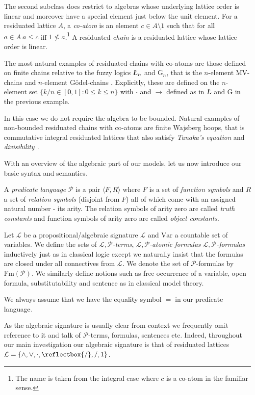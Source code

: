 \documentclass{lmcs} %
\newcommand{\?}{\ensuremath{\mkern0.4\thinmuskip}}
\newcommand{\Luk}{\text{\textsl{\L}}}%
\newcommand{\und}{\mathord{\reflectbox{/}}}%
\newcommand{\CL}{\mathcal{L}}
\newcommand{\CP}{\mathcal{P}}
\begin{document}
The second subclass does restrict to algebras whose underlying lattice order is linear and moreover have a special element just below the unit element. For a residuated lattice $A$, a \emph{co-atom} is an element $c\in A\setminus{1}$ such that for all $a\in A\ a\leq c$ iff $1\not\leq a$.\footnote{The name is taken from the integral case where $c$ is a co-atom in the familiar sense.} A residuated \emph{chain} is a residuated lattice whose lattice order is linear. 

\begin{exa}\label{exa:resichaincoatom}
    The most natural examples of residuated chains with co-atoms are those defined on finite chains relative to the fuzzy logics $\Luk_n$ and $\mathrm{G}_n$, that is the $n$-element MV-chains and $n$-element G\"{o}del-chains \cite[Example 2.4.2, Definition 1.3.1 ]{CintulaHajekNoguera11:Handbookvol2}. Explicitly, these are defined on the $n$-element set $\{k/n\in [0,1]:0\leq k\leq n\}$ with $\cdot$ and $\rightarrow$ defined as in $\Luk$ and $\mathrm{G}$ in the previous example.
    
    In this case we do not require the algebra to be bounded. Natural examples of non-bounded residuated chains with co-atoms are finite Wajsberg hoops, that is commutative integral residuated lattices that also satisfy \emph{Tanaka's equation} and \emph{divisibility}~\cite{Ugolini34:Wajsberghoops}.
\end{exa}

With an overview of the algebraic part of our models, let us now introduce our basic syntax and semantics. 
\begin{defi}
    A \textit{predicate language} $\CP$ is a pair $\langle F,R\rangle$ where $F$ is a set of \textit{function symbols} and $R$ a set of \textit{relation symbols} (disjoint from $F$) all of which come with an assigned natural number - its arity. The relation symbols of arity zero are called \textit{truth constants} and function symbols of arity zero are called \textit{object constants}. 

    Let $\CL$ be a propositional/algebraic signature $\CL$ and $\mathrm{Var}$ a countable set of variables. We define the sets of $\CL,\CP$\textit{-terms}, $\CL,\CP$\textit{-atomic formulas} $\CL,\CP$\textit{-formulas} inductively just as in classical logic except we naturally insist that the formulas are closed under all connectives from $\CL$. We denote the set of $\CP$-formulas by $\mathrm{Fm}(\CP)$. We similarly define notions such as free occurrence of a variable, open formula, substitutability and sentence as in classical model theory. 

    We always assume that we have the equality symbol $=$ in our predicate language. 
\end{defi}
\begin{rem}
    As the algebraic signature is usually clear from context we frequently omit reference to it and talk of $\CP$-terms, formulas, sentences etc. Indeed, throughout our main investigation our algebraic signature is that of residuated lattices $\CL=\{\land,\lor,\cdot,\und,/,1\}$.
\end{rem}
\end{document}
